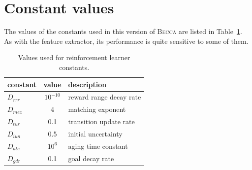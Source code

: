 \section{Constant values}

The values of the constants used in this version of \textsc{Becca} are listed in Table~\ref{actor_constants}. As with the feature extractor, its performance is quite sensitive to some of them.

\begin{table}[htdp]
\caption{Values used for reinforcement learner constants.}
\begin{center}
\begin{tabular}{|l|c|l|}
\hline
constant & value & description\\
\hline
$D_{rrr}$ & $10^{-10}$ & reward range decay rate\\
$D_{mex}$ & 4 & matching exponent\\
$D_{tur}$ & 0.1& transition update rate\\
$D_{iun}$ & 0.5 & initial uncertainty \\
$D_{atc}$ & $10^6$ & aging time constant \\
$D_{gdr}$ & 0.1 & goal decay rate \\
\hline
\end{tabular}
\end{center}
\label{actor_constants}
\end{table}%


